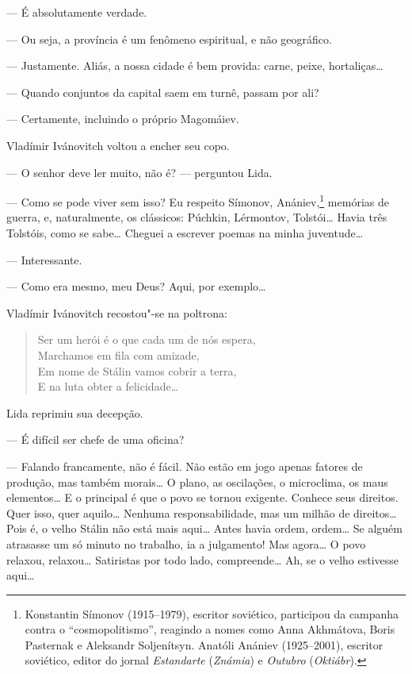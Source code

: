 --- É absolutamente verdade.

--- Ou seja, a província é um fenômeno espiritual, e não geográfico.

--- Justamente. Aliás, a nossa cidade é bem provida: carne, peixe,
hortaliças\ldots{}

--- Quando conjuntos da capital saem em turnê, passam por ali?

--- Certamente, incluindo o próprio Magomáiev.

Vladímir Ivánovitch voltou a encher seu copo.

--- O senhor deve ler muito, não é? --- perguntou Lida.

--- Como se pode viver sem isso? Eu respeito Símonov, Anániev,\footnote{Konstantin
  Símonov (1915--1979), escritor soviético, participou da campanha
  contra o ``cosmopolitismo'', reagindo a nomes como Anna Akhmátova,
  Boris Pasternak e Aleksandr Soljenítsyn. Anatóli Anániev (1925--2001),
  escritor soviético, editor do jornal \emph{Estandarte} (\emph{Známia})
  e \emph{Outubro} (\emph{Oktiábr}).} memórias de guerra, e,
naturalmente, os clássicos: Púchkin, Lérmontov, Tolstói\ldots{} Havia três
Tolstóis, como se sabe\ldots{} Cheguei a escrever poemas na minha
juventude\ldots{}

--- Interessante.

--- Como era mesmo, meu Deus? Aqui, por exemplo\ldots{}

Vladímir Ivánovitch recostou"-se na poltrona:

\begin{verse}
Ser um herói é o que cada um de nós espera,\\
Marchamos em fila com amizade,\\
Em nome de Stálin vamos cobrir a terra,\\
E na luta obter a felicidade\ldots{}
\end{verse}

Lida reprimiu sua decepção.

--- É difícil ser chefe de uma oficina?

--- Falando francamente, não é fácil. Não estão em jogo apenas fatores
de produção, mas também morais\ldots{} O plano, as oscilações, o microclima,
os maus elementos\ldots{} E o principal é que o povo se tornou exigente.
Conhece seus direitos. Quer isso, quer aquilo\ldots{} Nenhuma
responsabilidade, mas um milhão de direitos\ldots{} Pois é, o velho Stálin
não está mais aqui\ldots{} Antes havia ordem, ordem\ldots{} Se alguém atrasasse um
só minuto no trabalho, ia a julgamento! Mas agora\ldots{} O povo relaxou,
relaxou\ldots{} Satiristas por todo lado, compreende\ldots{} Ah, se o velho
estivesse aqui\ldots{}

